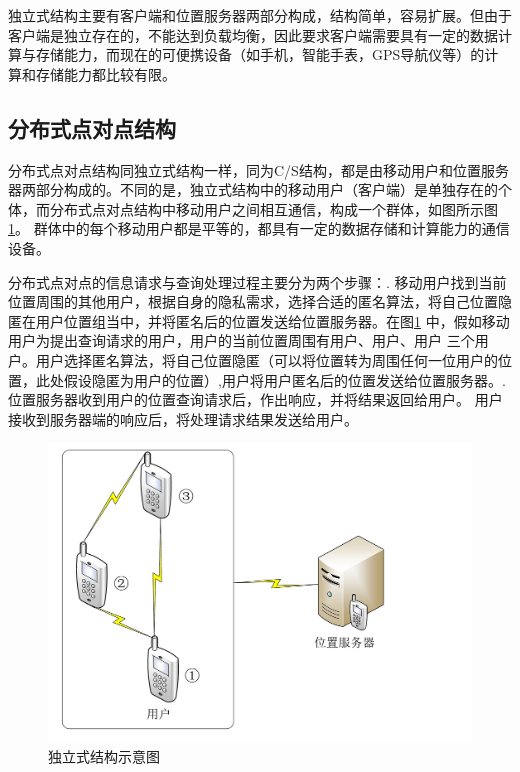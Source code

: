 独立式结构主要有客户端和位置服务器两部分构成，结构简单，容易扩展。但由于客户端是独立存在的，不能达到负载均衡，因此要求客户端需要具有一定的数据计算与存储能力，而现在的可便携设备（如手机，智能手表，GPS导航仪等）的计算和存储能力都比较有限。
\subsection{分布式点对点结构}
分布式点对点结构\cite{Gruteser}同独立式结构一样，同为C/S结构，都是由移动用户和位置服务器两部分构成的。不同的是，独立式结构中的移动用户（客户端）是单独存在的个体，而分布式点对点结构中移动用户之间相互通信，构成一个群体，如图所示图\ref{fig:p2p_pdf}。 群体中的每个移动用户都是平等的，都具有一定的数据存储和计算能力的通信设备。

分布式点对点的信息请求与查询处理过程主要分为两个步骤：. 移动用户找到当前位置周围的其他用户，根据自身的隐私需求，选择合适的匿名算法，将自己位置隐匿在用户位置组当中，并将匿名后的位置发送给位置服务器。在图\ref{fig:p2p_pdf} 中，假如移动用户为提出查询请求的用户，用户的当前位置周围有用户、用户、用户 三个用户。用户选择匿名算法，将自己位置隐匿（可以将位置转为周围任何一位用户的位置，此处假设隐匿为用户的位置）,用户将用户匿名后的位置发送给位置服务器。.位置服务器收到用户的位置查询请求后，作出响应，并将结果返回给用户。 用户 接收到服务器端的响应后，将处理请求结果发送给用户。


\begin{figure}[H]
\centering
\includegraphics[width=12cm]{fig/p2p.pdf}
\caption{独立式结构示意图} %
\label{fig:p2p_pdf}
\end{figure}

